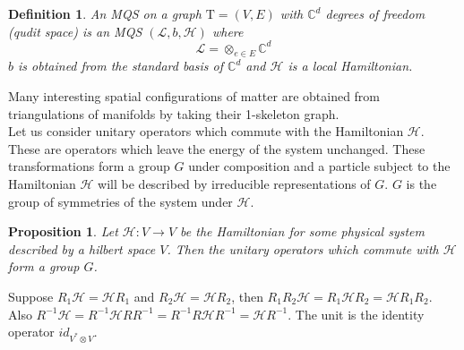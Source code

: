 \documentclass{article}
\newtheorem{definition}{Definition}
\newtheorem{proposition}[theorem]{Proposition}
\newenvironment{proof}[1][Proof]{\begin{trivlist}
\item[\hskip \labelsep {\bfseries #1}]}{\end{trivlist}}
\newcommand{\Tau}{\mathrm{T}}
\newcommand{\ham}{\mathcal{H}}
\begin{document}
\begin{definition}
An MQS on a graph $\Tau = (V,E)$ with $\mathbb{C}^d$ degrees of freedom (qudit space) is an MQS $(\mathcal{L},b, \mathcal{H})$ where
$$ \mathcal{L} = \otimes_{e\in E} \mathbb{C}^d$$
$b$ is obtained from the standard basis of $\mathbb{C}^d$ and $\mathcal{H}$ is a local Hamiltonian.
\end{definition}
Many interesting spatial configurations of matter are obtained from triangulations of manifolds by taking their 1-skeleton graph.\\
Let us consider unitary operators which commute with the Hamiltonian $\mathcal{H}$. These are operators which leave the energy of the system unchanged. These transformations form a group $G$ under composition and a particle subject to the Hamiltonian $\mathcal{H}$ will be described by irreducible representations of $G$. $G$ is the group of symmetries of the system under $\mathcal{H}$.

\begin{proposition}
Let $\mathcal{H}:V\rightarrow V$ be the Hamiltonian for some physical system described by a hilbert space $V$. Then the unitary operators which commute with $\mathcal{H}$ form a group $G$.
\end{proposition}
\begin{proof}
Suppose $R_1\ham=\ham R_1$ and $R_2\ham=\ham R_2$, then $R_1R_2\ham=R_1\ham R_2 = \ham R_1R_2$. Also $R^{-1}\ham = R^{-1}\ham RR^{-1} = R^{-1}R\ham R^{-1} =\ham R^{-1}$. The unit is the identity operator $id_{V^*\otimes V}$.
\end{proof}
\end{document}
